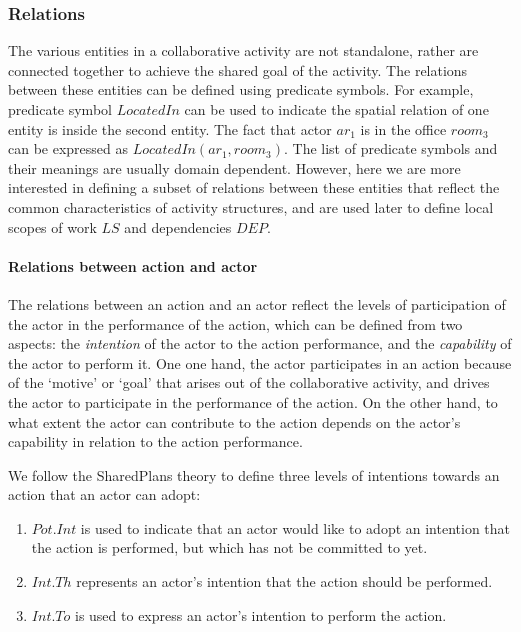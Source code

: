 \subsubsection{Relations} %
\label{ssub:relations}
The various entities in a collaborative activity are not standalone, rather are connected together to achieve the shared goal of the activity. The relations between these entities can be defined using predicate symbols. For example, predicate symbol $LocatedIn$ can be used to indicate the spatial relation of one entity is inside the second entity. The fact that actor $ar_1$ is in the office $room_3$ can be expressed as $LocatedIn(ar_1, room_3)$. The list of predicate symbols and their meanings are usually domain dependent. However, here we are more interested in defining a subset of relations between these entities that reflect the common characteristics of activity structures, and are used later to define local scopes of work $LS$ and dependencies $DEP$.

\paragraph*{Relations between action and actor} %
\label{par:relations_between_action_and_actor}
The relations between an action and an actor reflect the levels of participation of the actor in the performance of the action, which can be defined from two aspects: the \emph{intention} of the actor to the action performance, and the \emph{capability} of the actor to perform it. One one hand, the actor participates in an action because of the `motive' or `goal' that arises out of the collaborative activity, and drives the actor to participate in the performance of the action. On the other hand, to what extent the actor can contribute to the action depends on the actor's capability in relation to the action performance. 

We follow the SharedPlans theory \cite{grosz1996collaborative} to define three levels of intentions towards an action that an actor can adopt:

\begin{enumerate}
	\item $Pot.Int$ is used to indicate that an actor would like to adopt an intention that the action is performed, but which has not be committed to yet.
	\item $Int.Th$ represents an actor's intention that the action should be performed.
	\item $Int.To$ is used to express an actor's intention to perform the action.
\end{enumerate}

